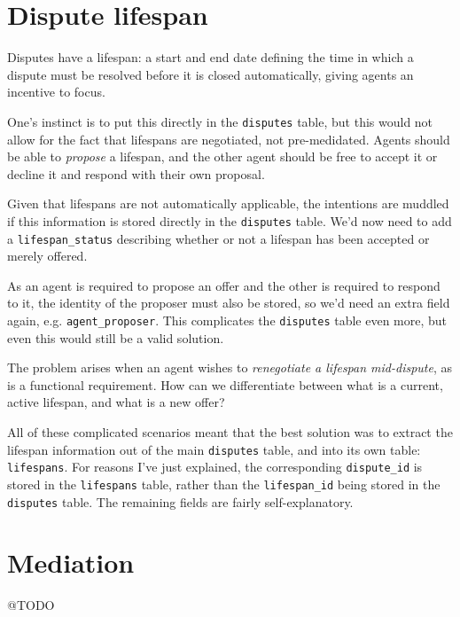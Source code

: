 \section{Dispute lifespan}

Disputes have a lifespan: a start and end date defining the time in which a dispute must be resolved before it is closed automatically, giving agents an incentive to focus.

One's instinct is to put this directly in the \lstinline{disputes} table, but this would not allow for the fact that lifespans are negotiated, not pre-medidated. Agents should be able to \emph{propose} a lifespan, and the other agent should be free to accept it or decline it and respond with their own proposal.

Given that lifespans are not automatically applicable, the intentions are muddled if this information is stored directly in the \lstinline{disputes} table. We'd now need to add a \lstinline{lifespan_status} describing whether or not a lifespan has been accepted or merely offered.

As an agent is required to propose an offer and the other is required to respond to it, the identity of the proposer must also be stored, so we'd need an extra field again, e.g. \lstinline{agent_proposer}. This complicates the \lstinline{disputes} table even more, but even this would still be a valid solution.

The problem arises when an agent wishes to \emph{renegotiate a lifespan mid-dispute}, as is a functional requirement. How can we differentiate between what is a current, active lifespan, and what is a new offer?

All of these complicated scenarios meant that the best solution was to extract the lifespan information out of the main \lstinline{disputes} table, and into its own table: \lstinline{lifespans}. For reasons I've just explained, the corresponding \lstinline{dispute_id} is stored in the \lstinline{lifespans} table, rather than the \lstinline{lifespan_id} being stored in the \lstinline{disputes} table. The remaining fields are fairly self-explanatory.

\section{Mediation}

@TODO